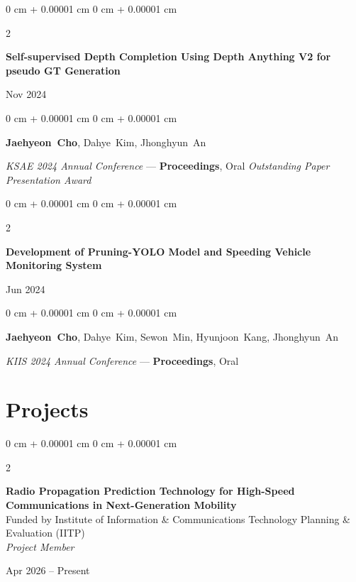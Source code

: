 \documentclass[10pt, letterpaper]{article}
\newenvironment{onecolentry}{
    \begin{adjustwidth}{
        0 cm + 0.00001 cm
    }{
        0 cm + 0.00001 cm
    }
}{
    \end{adjustwidth}
} %
\newenvironment{twocolentry}[2][]{
    \onecolentry
    \def\secondColumn{#2}
    \setcolumnwidth{\fill, 4.5 cm}
    \begin{paracol}{2}
}{
    \switchcolumn \raggedleft \secondColumn
    \end{paracol}
    \endonecolentry
} %
\begin{document}
    \vspace{0.05cm}
    
    \begin{samepage}
    \begin{twocolentry}{Nov 2024}
      \textbf{Self-supervised Depth Completion Using Depth Anything V2 for pseudo GT Generation}
    \end{twocolentry}
    
    \vspace{0.10 cm}
    \begin{onecolentry}
      \mbox{\textbf{Jaehyeon Cho}}, \mbox{Dahye Kim}, \mbox{Jhonghyun An}
      \vspace{0.10 cm}
    
      \textit{KSAE 2024 Annual Conference} — \textbf{Proceedings}, Oral \quad \textit{Outstanding Paper Presentation Award}
    \end{onecolentry}
    \end{samepage}
    
    \vspace{0.05cm}
    
    \begin{samepage}
    \begin{twocolentry}{Jun 2024}
      \textbf{Development of Pruning-YOLO Model and Speeding Vehicle Monitoring System}
    \end{twocolentry}
    
    \vspace{0.10 cm}
    \begin{onecolentry}
      \mbox{\textbf{Jaehyeon Cho}}, \mbox{Dahye Kim}, \mbox{Sewon Min}, \mbox{Hyunjoon Kang}, \mbox{Jhonghyun An}
      \vspace{0.10 cm}
    
      \textit{KIIS 2024 Annual Conference} — \textbf{Proceedings}, Oral
    \end{onecolentry}
    \end{samepage}
    
    \section{Projects}

        \begin{twocolentry}{Apr 2026 -- Present}
            \textbf{Radio Propagation Prediction Technology for High-Speed Communications in Next-Generation Mobility} \\
            {\small Funded by Institute of Information \& Communications Technology Planning \& Evaluation (IITP)} \\
            \textit{Project Member}
        \end{twocolentry}
\end{document}
